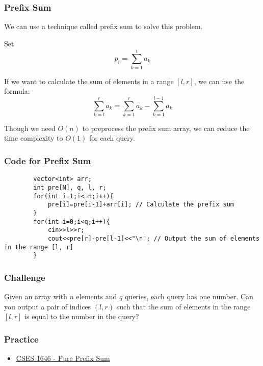 \documentclass[xcolor=dvipsnames]{beamer}
\begin{document}
    \begin{frame}
        \frametitle{Prefix Sum}
        We can use a technique called prefix sum to solve this problem.

        Set $$p_i=\displaystyle\sum_{k=1}^{i}a_k$$

        If we want to calculate the sum of elements in a range $[l, r]$,
        we can use the formula:
        $$\displaystyle\sum_{k=l}^{r}a_k = \displaystyle\sum_{k=1}^{r}a_k - \displaystyle\sum_{k=1}^{l-1}a_k$$

        Though we need $O(n)$ to preprocess the prefix sum array, we can reduce the time complexity to $O(1)$ for each query.
    \end{frame}

    \begin{frame}[fragile]
        \frametitle{Code for Prefix Sum}
        \begin{verbatim}
        vector<int> arr;
        int pre[N], q, l, r;
        for(int i=1;i<=n;i++){
            pre[i]=pre[i-1]+arr[i]; // Calculate the prefix sum
        }
        for(int i=0;i<q;i++){
            cin>>l>>r;
            cout<<pre[r]-pre[l-1]<<"\n"; // Output the sum of elements in the range [l, r]
        }
        \end{verbatim}        
        
    \end{frame}    

    \begin{frame}
        \frametitle{Challenge}
        Given an array with $n$ elements and $q$ queries, each query has one number.
        Can you output a pair of indices $(l, r)$ such that the sum of elements in the range 
        $[l, r]$ is equal to the number in the query?

    \end{frame}

    \begin{frame}
        \frametitle{Practice}
        \begin{itemize}
            \item \href{https://cses.fi/problemset/task/1646}{CSES 1646 - Pure Prefix Sum}
        \end{itemize}
    \end{frame}
\end{document}
